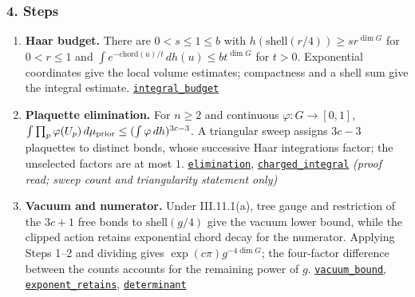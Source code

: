 \documentclass[
  letterpaper,
  11pt]{article}
\begin{document}
\subsubsection{4. Steps}\label{steps-13}

\begin{enumerate}
\def\labelenumi{\arabic{enumi}.}
\item
  \textbf{Haar budget.} There are \(0<s\le1\le b\) with
  \(h(\mathrm{shell}(r/4))\ge sr^{\dim G}\) for \(0<r\le1\) and
  \(\int e^{-\mathrm{chord}(u)/t}\,dh(u)\le bt^{\dim G}\) for \(t>0\).
  Exponential coordinates give the local volume estimates; compactness
  and a shell sum give the integral estimate.
  \href{https://github.com/yang-mills-group/OpenAI-YM-20261028/blob/3456e5e75cf8d4cd558955a5c7638fba2d68f464/YM/Next/RANK/Haar.lean\#L170-L211}{\texttt{integral\_budget}}
\item
  \textbf{Plaquette elimination.} For \(n\ge2\) and continuous
  \(\varphi:G\to[0,1]\),
  \(\int\prod_p\varphi(U_p)\,d\mu_{\rm prior}\le(\int\varphi\,dh)^{3c-3}\).
  A triangular sweep assigns \(3c-3\) plaquettes to distinct bonds,
  whose successive Haar integrations factor; the unselected factors are
  at most \(1\).
  \href{https://github.com/yang-mills-group/OpenAI-YM-20261028/blob/3456e5e75cf8d4cd558955a5c7638fba2d68f464/YM/Next/RANK/Axial.lean\#L368-L383}{\texttt{elimination}},
  \href{https://github.com/yang-mills-group/OpenAI-YM-20261028/blob/3456e5e75cf8d4cd558955a5c7638fba2d68f464/YM/Next/RANK/Axial.lean\#L347-L365}{\texttt{charged\_integral}}
  \emph{(proof read; sweep count and triangularity statement only)}
\item
  \textbf{Vacuum and numerator.} Under III.11.1(a), tree gauge and
  restriction of the \(3c+1\) free bonds to \(\mathrm{shell}(g/4)\) give
  the vacuum lower bound, while the clipped action retains exponential
  chord decay for the numerator. Applying Steps 1--2 and dividing gives
  \(\exp(c\pi)g^{-4\dim G}\); the four-factor difference between the
  counts accounts for the remaining power of \(g\).
  \href{https://github.com/yang-mills-group/OpenAI-YM-20261028/blob/3456e5e75cf8d4cd558955a5c7638fba2d68f464/YM/Next/RANK/Determinant.lean\#L76-L111}{\texttt{vacuum\_bound}},
  \href{https://github.com/yang-mills-group/OpenAI-YM-20261028/blob/3456e5e75cf8d4cd558955a5c7638fba2d68f464/YM/Next/RANK/Determinant.lean\#L153-L181}{\texttt{exponent\_retains}},
  \href{https://github.com/yang-mills-group/OpenAI-YM-20261028/blob/3456e5e75cf8d4cd558955a5c7638fba2d68f464/YM/Next/RANK/Determinant.lean\#L240-L274}{\texttt{determinant}}

\end{enumerate}
\end{document}
